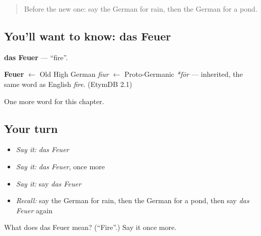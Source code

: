 \begin{quote}
Before the new one: say the German for rain, then the German for a pond.
\end{quote}

\subsection*{You'll want to know: das Feuer}
\textbf{das Feuer} — \textquotedblleft{}fire\textquotedblright{}.

\begin{cousinweb}
\textbf{Feuer} $\leftarrow$ Old High German \emph{fiur} $\leftarrow$ Proto-Germanic \emph{*fōr} — inherited, the same word as English \emph{fire}. (EtymDB 2.1)
\end{cousinweb}

\begin{grammarlens}[title={What you've built}]
One more word for this chapter.
\end{grammarlens}

\subsection*{Your turn}
\begin{itemize}
\raggedright
  \item \emph{Say it:} \emph{das Feuer}
  \item \emph{Say it:} \emph{das Feuer}, once more
  \item \emph{Say it:} say \emph{das Feuer}
  \item \emph{Recall:} say the German for rain, then the German for a pond, then say \emph{das Feuer} again
\end{itemize}

\begin{tcolorbox}[breakable,colback=teal!4,colframe=teal!35!black,title={Before you move on}]
What does das Feuer mean? (\textquotedblleft{}Fire\textquotedblright{}.) Say it once more.
\end{tcolorbox}
